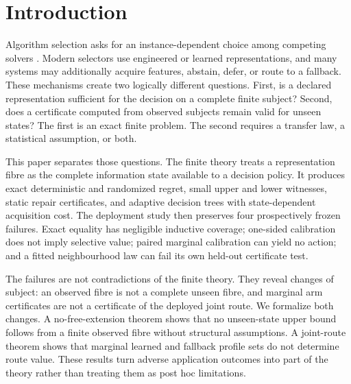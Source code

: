 \documentclass[11pt]{article}
\theoremstyle{definition}
\theoremstyle{remark}
\begin{document}
\section{Introduction}

Algorithm selection asks for an instance-dependent choice among competing solvers \citep{rice1976algorithm,xu2008satzilla,bischl2016aslib}.  Modern selectors use engineered or learned representations, and many systems may additionally acquire features, abstain, defer, or route to a fallback.  These mechanisms create two logically different questions.  First, is a declared representation sufficient for the decision on a complete finite subject?  Second, does a certificate computed from observed subjects remain valid for unseen states?  The first is an exact finite problem.  The second requires a transfer law, a statistical assumption, or both.

This paper separates those questions.  The finite theory treats a representation fibre as the complete information state available to a decision policy.  It produces exact deterministic and randomized regret, small upper and lower witnesses, static repair certificates, and adaptive decision trees with state-dependent acquisition cost.  The deployment study then preserves four prospectively frozen failures.  Exact equality has negligible inductive coverage; one-sided calibration does not imply selective value; paired marginal calibration can yield no action; and a fitted neighbourhood law can fail its own held-out certificate test.

The failures are not contradictions of the finite theory.  They reveal changes of subject: an observed fibre is not a complete unseen fibre, and marginal arm certificates are not a certificate of the deployed joint route.  We formalize both changes.  A no-free-extension theorem shows that no unseen-state upper bound follows from a finite observed fibre without structural assumptions.  A joint-route theorem shows that marginal learned and fallback profile sets do not determine route value.  These results turn adverse application outcomes into part of the theory rather than treating them as post hoc limitations.
\end{document}
